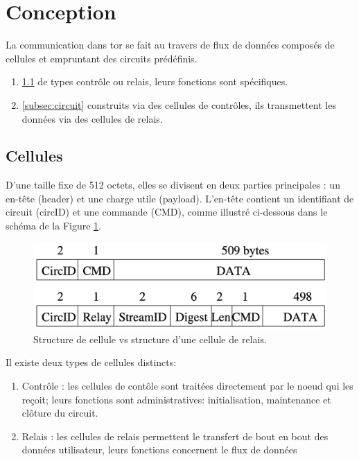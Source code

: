 \section{Conception}\label{sec:design}
La communication dans \acrshort{tor} se fait au travers de flux de données composés de cellules et empruntant des circuits prédéfinis.

\begin{enumerate}
    \item \ref{subsec:cellule}  de types contrôle ou relais, leurs fonctions sont spécifiques.
    \item \ref{subsec:circuit}  construits via des cellules de contrôles, ils transmettent les données via des cellules de relais.
\end{enumerate}
\subsection{Cellules}\label{subsec:cellule}

D'une taille fixe de 512 octets, elles se divisent en deux parties principales : un en-tête (header) et une charge utile (payload). 
L'en-tête contient un identifiant de circuit (circID) et une commande (CMD), comme illustré ci-dessous dans le schéma de la Figure \ref{fig:structure-cellule}.

\begin{figure}[h!]
    \centering
    \includegraphics[width=0.5\linewidth]{Images/Diagrams/cellule.png}
    \caption{Structure de cellule vs structure d'une cellule de relais. \cite[Tor: The Second-Generation Onion Router]{dingledine_tor_2004}}
    \label{fig:structure-cellule}
\end{figure}

Il existe deux types de cellules distincts:
\begin{enumerate}
    \item Contrôle : les cellules de contôle sont traitées directement par le noeud qui les reçoit; leurs fonctions sont administratives: initialisation, maintenance et clôture du circuit.
    \item Relais : les cellules de relais permettent le transfert de bout en bout des données utilisateur, leurs fonctions concernent le flux de données
\end{enumerate}

